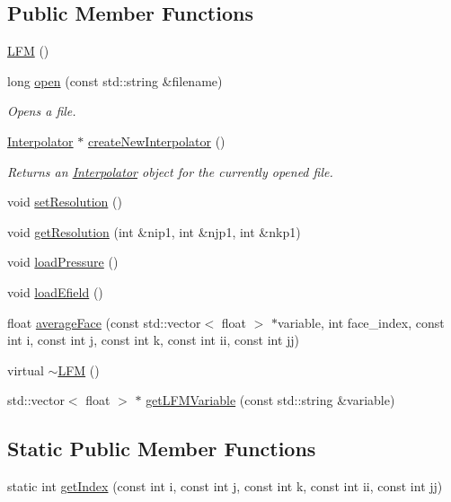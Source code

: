 \subsection*{Public Member Functions}
\begin{DoxyCompactItemize}
\item 
\hyperlink{classccmc_1_1_l_f_m_a9fb6554dddcf4bb70bbb19622130cf69}{L\-F\-M} ()
\item 
long \hyperlink{classccmc_1_1_l_f_m_a8a9e74e6951db85a54cffbf6c1305f9f}{open} (const std\-::string \&filename)
\begin{DoxyCompactList}\small\item\em Opens a file. \end{DoxyCompactList}\item 
\hyperlink{classccmc_1_1_interpolator}{Interpolator} $\ast$ \hyperlink{classccmc_1_1_l_f_m_a6cda025f32e66de186e723f7d16e8639}{create\-New\-Interpolator} ()
\begin{DoxyCompactList}\small\item\em Returns an \hyperlink{classccmc_1_1_interpolator}{Interpolator} object for the currently opened file. \end{DoxyCompactList}\item 
void \hyperlink{classccmc_1_1_l_f_m_a3b30357fb47547a19b480a824aae19ef}{set\-Resolution} ()
\item 
void \hyperlink{classccmc_1_1_l_f_m_ae4a27c5fc9f52300575eb495beaeda9c}{get\-Resolution} (int \&nip1, int \&njp1, int \&nkp1)
\item 
void \hyperlink{classccmc_1_1_l_f_m_a50299b9da81da02df430d0079d8deaf5}{load\-Pressure} ()
\item 
void \hyperlink{classccmc_1_1_l_f_m_a3159c537415c5da69c86ed5bc8791019}{load\-Efield} ()
\item 
float \hyperlink{classccmc_1_1_l_f_m_a950345d5557b42e68ebd8e8d8b4a4a44}{average\-Face} (const std\-::vector$<$ float $>$ $\ast$variable, int face\-\_\-index, const int i, const int j, const int k, const int ii, const int jj)
\item 
virtual \hyperlink{classccmc_1_1_l_f_m_ab7867c983e99e38e19e120dcbf38420c}{$\sim$\-L\-F\-M} ()
\item 
std\-::vector$<$ float $>$ $\ast$ \hyperlink{classccmc_1_1_l_f_m_a72536081ec39b9f9620b49e4a4ac58d5}{get\-L\-F\-M\-Variable} (const std\-::string \&variable)
\end{DoxyCompactItemize}
\subsection*{Static Public Member Functions}
\begin{DoxyCompactItemize}
\item 
static int \hyperlink{classccmc_1_1_l_f_m_ace1eb0153ce938756984444bba34a7cb}{get\-Index} (const int i, const int j, const int k, const int ii, const int jj)
\end{DoxyCompactItemize}
